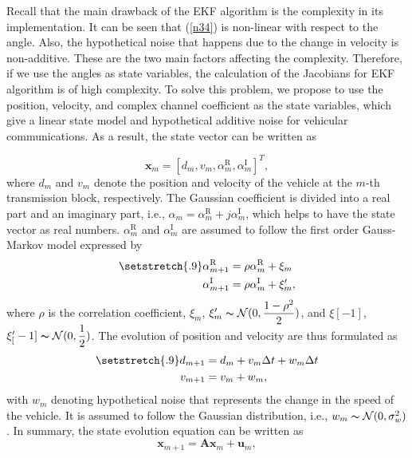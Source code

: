 \documentclass{ieeeaccess}
\begin{document}
Recall that the main drawback of the EKF algorithm is the complexity in its implementation. It can be seen that (\ref{n34}) is non-linear with respect to the angle. Also, the hypothetical noise that happens due to the change in velocity is non-additive. These are the two main factors affecting the complexity. Therefore, if we use the angles as state variables, the calculation of the Jacobians for EKF algorithm is of high complexity. To solve this problem, we propose to use the position, velocity, and complex channel coefficient as the state variables, which give a linear state model and hypothetical additive noise for vehicular communications. As a result, the state vector can be written as

\begin{equation} \label{n40}
\boldsymbol{x}_m = [d_m,v_m,\alpha_m^\textrm{R},\alpha_m^\textrm{I}]^T,
\end{equation}
where $d_m$ and $v_m$ denote the position and velocity of the vehicle at the $m$-th transmission block, respectively. The Gaussian coefficient is divided into a real part and an imaginary part, i.e., $\alpha_m = \alpha_m^\textrm{R} + j\alpha_m^\textrm{I}$, which helps to have the state vector as real numbers.  $\alpha_m^\textrm{R}$ and $\alpha_m^\textrm{I}$ are assumed to follow the first order Gauss-Markov model expressed by \cite{rh_track}
\begin{align} \label{n41}
\setstretch{.9}
\alpha_{m+1}^\textrm{R} &=\rho \alpha_m^\textrm{R} + \xi_m\\
\alpha_{m+1}^\textrm{I} &=\rho \alpha_m^\textrm{I} + \xi'_m,
\end{align}
where $\rho$ is the correlation coefficient, $\xi_m$, $\xi'_m \thicksim \mathcal{N}(0,\dfrac{1-\rho^2}{2})$, and  $\xi[-1]$, $\xi'_[-1] \thicksim \mathcal{N}(0,\dfrac{1}{2})$. The evolution of position and velocity are thus formulated as
\begin{align} \label{n42}
\setstretch{.9}
d_{m+1} &= d_m + v_m\Delta t + w_m\Delta t\\
v_{m+1} &= v_m + w_m,
\end{align}
with $w_m$ denoting hypothetical noise that represents the change in the speed of the vehicle. It is assumed to follow the Gaussian distribution, i.e., $w_m\thicksim \mathcal{N}(0,\sigma_w^2)$. In summary, the state evolution equation can be written as
\begin{equation} \label{n43}
\boldsymbol{x}_{m+1} =\boldsymbol{A} \boldsymbol{x}_m + \boldsymbol{u}_m,
\end{equation}
\end{document}
